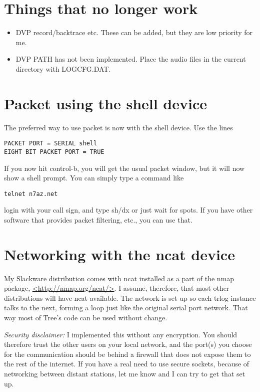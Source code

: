 \documentclass[12pt]{article}
\begin{document}
\section{Things that no longer work}
\begin{itemize}

\item
DVP record/backtrace etc. These can be added, but they are
low priority for me.
\item
DVP PATH has not been implemented. Place the audio files in the
current directory with LOGCFG.DAT.

\end{itemize}


\section{Packet using the shell device}
The preferred way to use packet is now with the shell device.
Use the lines
\begin{verbatim}
PACKET PORT = SERIAL shell
EIGHT BIT PACKET PORT = TRUE
\end{verbatim}
If you now hit control-b, you will get the usual packet window, but
it will now show a shell prompt. You can simply type a command like
\begin{verbatim}
telnet n7az.net
\end{verbatim}
login with your call sign, and type sh/dx or just wait for spots.
If you have other software that provides packet filtering, etc., you
can use that.

\section{Networking with the ncat device}
My Slackware distribution comes with ncat installed as a part of the
nmap package, \url{<http://nmap.org/ncat/>}.  I assume, therefore,
that most other distributions will have ncat available. The network
is set up so each trlog instance talks to the next, forming
a loop just like the original serial port network. That way most of
Tree's code can be used without change.

{\em Security disclaimer:} I implemented this without any encryption.
You should therefore trust the other users on your local network,
and the port(s) you choose for the communication should be behind
a firewall that does not expose them to the rest of the internet.
If you have a real need to use secure sockets, because of networking
between distant stations, let me know and I can try to get that
set up. 
\end{document}
